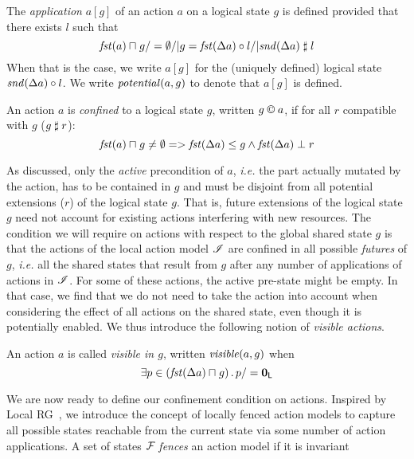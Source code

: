 \begin{definition}\label{def:actionApplication}
The \emph{application} $a[g]$ of an action $a$ on a logical state $g$ is defined provided that there exists $l$ such that
%
\[
	\mathit{fst}(a) \sqcap_{} g /=\emptyset /|
	g = \mathit{fst}(\Delta {a}) \circ l /|
	\mathit{snd}(\Delta {a})\mathrel{\sharp} l
\]
%
When that is the case, we write $a[g]$ for the (uniquely defined) logical state $\mathit{snd}(\Delta {a})\circ l$. We write $\mathit{potential}(a,g)$ to denote that $a[g]$ is defined.
%
\end{definition}
%
%
\begin{definition}\label{def:actconf}
An action $a$ is \emph{confined} to a logical state $g$, written $g\containI a$, if for all $r$ compatible with $g$ ($g \mathrel{\sharp} r$):
%
\[
	\mathit{fst}(a)\sqcap_{} g \neq\emptyset => \mathit{fst}(\Delta {a})\leq g \land \mathit{fst}(\Delta {a}) \mathrel{\bot} r
\]
\end{definition}
%
As discussed, only the \emph{active} precondition of $a$, \textit{i.e.} the part actually mutated by the action, has to be contained in $g$ and must be disjoint from all potential extensions ($r$) of the logical state $g$. That is, future extensions of the logical state $g$ need not account for existing actions interfering with new resources.
The condition we will require on actions with respect to the global shared state $g$ is that the actions of the local action model $\mathscr{I}$ are confined in all possible \emph{futures} of $g$, \textit{i.e.} all the shared states that result from $g$ after any number of applications of actions in $\mathscr{I}$. For some of these actions, the active pre-state might be empty. In that case, we find that we do not need to take the action into account when considering the effect of all actions on the shared state, even though it is potentially enabled. We thus introduce the following notion of \emph{visible actions}.
%
%
\begin{definition}
An action $a$ is called \emph{visible in $g$}, written $\mathit{visible}(a,g)$ when
%
\[
	\exists p \in \left(\mathit{fst}(\Delta {a})\sqcap_{} g\right).\, p /= \mathbf{0}_{\textsf{L}}
\]
%
\end{definition}
%
%
We are now ready to define our confinement condition on actions. Inspired by Local RG~\cite{lrg}, we introduce the concept of locally fenced action models to capture all possible states reachable from the current state via some number of action applications. A set of states $\mathcal{F}_{}$ \emph{fences} an action model if it is invariant
